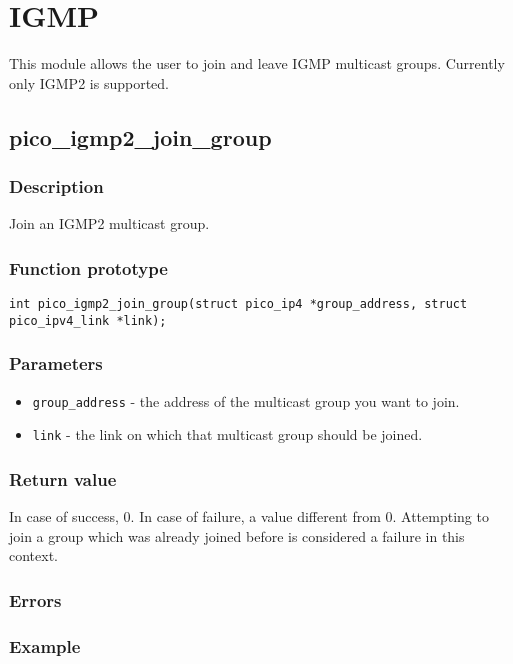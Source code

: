 \section{IGMP}

This module allows the user to join and leave IGMP multicast groups. Currently only IGMP2 is supported.


\subsection{pico\_igmp2\_join\_group}

\subsubsection*{Description}
Join an IGMP2 multicast group.

\subsubsection*{Function prototype}
\texttt{int pico\_igmp2\_join\_group(struct pico\_ip4 *group\_address, struct pico\_ipv4\_link *link);}

\subsubsection*{Parameters}
\begin{itemize}
\item \texttt{group\_address} - the address of the multicast group you want to join.
\item \texttt{link} - the link on which that multicast group should be joined.
\end{itemize}

\subsubsection*{Return value}
In case of success, 0. In case of failure, a value different from 0. Attempting to join a group which was already joined before is considered a failure in this context. 

\subsubsection*{Errors}

\subsubsection*{Example}


